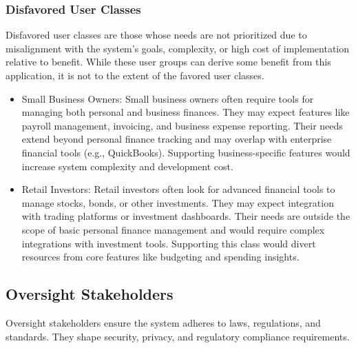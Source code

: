 \subsubsection{Disfavored User Classes}
Disfavored user classes are those whose needs are not prioritized due to misalignment with the system’s goals, complexity, or high cost of implementation relative to benefit. While these user groups can derive some benefit from this application, it is not to the extent of the favored user classes. 

\begin{itemize}
    \item Small Business Owners: Small business owners often require tools for managing both personal and business finances. They may expect features like payroll management, invoicing, and business expense reporting. Their needs extend beyond personal finance tracking and may overlap with enterprise financial tools (e.g., QuickBooks). Supporting business-specific features would increase system complexity and development cost.
    
    \item Retail Investors: Retail investors often look for advanced financial tools to manage stocks, bonds, or other investments. They may expect integration with trading platforms or investment dashboards. Their needs are outside the scope of basic personal finance management and would require complex integrations with investment tools. Supporting this class would divert resources from core features like budgeting and spending insights.

\end{itemize}
\subsection{Oversight Stakeholders}
Oversight stakeholders ensure the system adheres to laws, regulations, and standards. They shape security, privacy, and regulatory compliance requirements.
